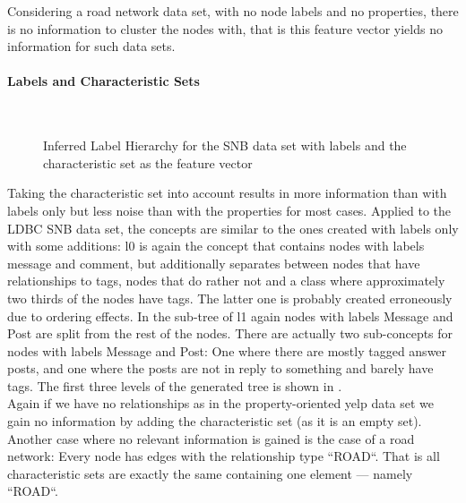 Considering a road network data set, with no node labels and no properties, there is no information to cluster the nodes with, that is this feature vector yields no information for such data sets. \\

\paragraph{Labels and Characteristic Sets}
\begin{figure}[htp]
    \centering
     \\
    \caption{Inferred Label Hierarchy for the SNB data set with labels and the characteristic set as the feature vector}
    \label{fig:lcldbctree}
\end{figure}{}
Taking the characteristic set into account results in more information than with labels only but less noise than with the properties for most cases. Applied to the LDBC SNB data set, the concepts are similar to the ones created with labels only with some additions: l0 is again the concept that contains nodes with labels message and comment, but additionally separates between nodes that have relationships to tags, nodes that do rather not and a class where approximately two thirds of the nodes have tags. The latter one is probably created erroneously due to ordering effects. In the sub-tree of l1 again nodes with labels Message and Post are split from the rest of the nodes. There are actually two sub-concepts for nodes with labels Message and Post: One where there are mostly tagged answer posts, and one where the posts are not in reply to something and barely have tags. The first three levels of the generated tree is shown in . \\

Again if we have no relationships as in the property-oriented yelp data set we gain no information by adding the characteristic set (as it is an empty set). Another case where no relevant information is gained is the case of a road network: Every node has edges with the relationship type ``ROAD``. That is all characteristic sets are exactly the same containing one element --- namely ``ROAD``. \\

